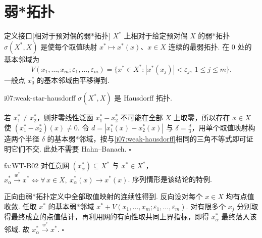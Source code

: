 \section{弱*拓扑}\label{sec:i07-weak-star-topology}

\begin{FALightBox}{定义接口}[相对于预对偶的弱*拓扑]
\(\displaystyle X^*\) 上相对于给定预对偶 \(\displaystyle X\) 的弱*拓扑 \(\displaystyle \sigma(X^*,X)\) 是使每个取值映射 \(\displaystyle x^*\mapsto x^*(x)\)、\(\displaystyle x\in X\) 连续的最弱拓扑. 在 \(\displaystyle0\) 处的基本邻域为
\[
V(x_1,\dots,x_m;\varepsilon_1,\dots,\varepsilon_m)
=\{x^*\in X^*:|x^*(x_j)|<\varepsilon_j,\ 1\leqslant j\leqslant m\}.
\]
一般点 \(\displaystyle x_0^*\) 的基本邻域由平移得到.
\end{FALightBox}

\begin{FAProposition}[B][弱*拓扑为Hausdorff]{i07:weak-star-hausdorff}
\(\displaystyle \sigma(X^*,X)\) 是 Hausdorff 拓扑.
\end{FAProposition}

\begin{FAProof}
若 \(\displaystyle x_1^*\neq x_2^*\)，则非零线性泛函 \(\displaystyle x_1^*-x_2^*\) 不可能在全部 \(\displaystyle X\) 上取零，所以存在 \(\displaystyle x\in X\) 使 \(\displaystyle (x_1^*-x_2^*)(x)\neq0\). 令 \(\displaystyle d=|x_1^*(x)-x_2^*(x)|\) 与 \(\displaystyle \delta=\frac{d}{3}\)，用单个取值映射构造两个半径 \(\displaystyle \delta\) 的基本弱*邻域，按与\autoref{i07:weak-hausdorff}相同的三角不等式即可证明它们不交. 此处不需要 Hahn--Banach.
\hfill\(\square\)
\end{FAProof}

\begin{FATheorem}[B][弱*收敛的预对偶刻画]{fa:WT-B02}
对任意网 \(\displaystyle (x_\alpha^*)\subseteq X^*\) 与 \(\displaystyle x^*\in X^*\)， \(\displaystyle x_\alpha^*\overset{w^*}{\longrightarrow}x^* \iff \forall\,x\in X,\ x_\alpha^*(x)\to x^*(x)\).
序列情形是该结论的特例.
\end{FATheorem}

\begin{FAProof}
正向由弱*拓扑定义中全部取值映射的连续性得到. 反向设对每个 \(\displaystyle x\in X\) 均有点值收敛. 任取 \(\displaystyle x^*\) 的基本弱*邻域 \(\displaystyle x^*+V(x_1,\dots,x_m;\varepsilon_1,\dots,\varepsilon_m)\).
对有限多个 \(\displaystyle x_j\) 分别取得最终成立的点值估计，再利用网的有向性取共同上界指标，即得 \(\displaystyle x_\alpha^*\) 最终落入该邻域. 故 \(\displaystyle x_\alpha^*\overset{w^*}{\longrightarrow}x^*\).
\hfill\(\square\)
\end{FAProof}

